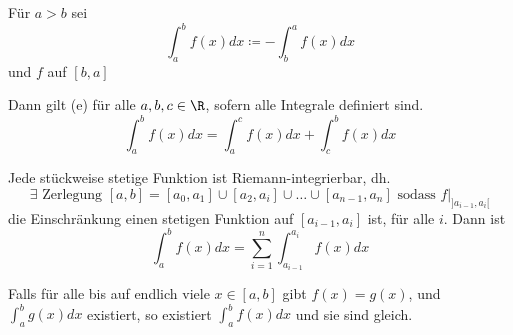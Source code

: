 \begin{bem}
	Für $a > b$ sei
	\[ \int_a^b f(x) dx \coloneqq -\int_b^a f(x) dx \]
	und $f$ auf $[b,a]$
	
	Dann gilt (e) für alle $a, b, c \in \R$, sofern alle Integrale definiert sind.
	\[ \int_a^b f(x) dx = \int_a^c f(x) dx + \int_c^b f(x) dx \]
\end{bem}
\begin{bem}
	Jede stückweise stetige Funktion ist Riemann-integrierbar, dh.
	\[ \exists \text{ Zerlegung } [a,b] = [a_0,a_1] \cup [a_2 , a_i] \cup \dots \cup [a_{n-1} , a_n] \text{ sodass } f|_{]a_{i-1} , a_i[} \]
	die Einschränkung einen stetigen Funktion auf $[a_{i-1} , a_i]$ ist, für alle $i$. Dann ist
	\[ \int_a^b f(x) dx = \sum_{i=1}^n \int_{a_{i-1}}^{a_i} f(x) dx \]
\end{bem}
\begin{fakt}
	Falls für alle bis auf endlich viele $x \in [a,b]$ gibt $f(x) = g(x)$, und $\int_a^b g(x) dx$ existiert, so existiert $\int_a^b f(x) dx$ und sie sind gleich.
\end{fakt}

